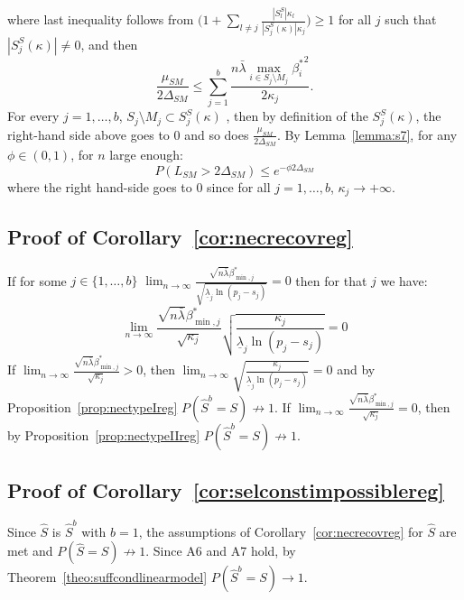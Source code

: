 \documentclass[aos]{imsart}
\theoremstyle{plain}
\begin{document}
where last inequality follows from $\Big(1+\sum_{l\neq j}\frac{|S_l^S|\kappa_l}{|S_j^{S}(\kappa)|\kappa_j}\Big)\geq 1$ for all $j$ such that $|S_j^{S}(\kappa)|\neq 0$, and then
$$\frac{\mu_{SM}}{2\Delta_{SM}}\leq \sum_{j=1}^b\frac{n\bar{\lambda}\max_{i\in S_j\setminus M_j}{\beta_i^*}^2}{2\kappa_j}.$$
For every $j=1,\ldots,b$, $S_j\setminus M_j \subset S_j^{S}(\kappa)$ , then by definition of the $S_j^{S}(\kappa)$, the right-hand 
side above goes to 0 and so does $\frac{\mu_{SM}}{2\Delta_{SM}}$. By Lemma~\ref{lemma:s7}, for any $\phi \in (0,1)$, for $n$ large enough:
\begin{equation}
    P(L_{SM}> 2\Delta_{SM}) \leq e^{-\phi2\Delta_{SM}}
\end{equation} 
where the right hand-side goes to 0 since for all $j=1,\ldots,b$, $\kappa_j \to +\infty$. 

\subsection{Proof of Corollary~\ref{cor:necrecovreg}}
If for some $j\in\{1,\ldots,b\}$ $\lim_{n\to\infty}\frac{\sqrt{n\bar{\lambda}}\beta_{\min,j}^*}{\sqrt{\underline{\lambda}_j\ln(p_j-s_j)}} = 0$ then for that $j$ we have:
$$\lim_{n\to\infty}\frac{\sqrt{n\bar{\lambda}}\beta_{\min,j}^*}{\sqrt{\kappa_j}}\sqrt{\frac{\kappa_j}{\underline{\lambda}_j\ln(p_j-s_j)}} = 0$$
If $\lim_{n\to\infty}\frac{\sqrt{n\bar{\lambda}}\beta_{\min,j}^*}{\sqrt{\kappa_j}}>0$, then $\lim_{n\to\infty}\sqrt{\frac{\kappa_j}{\underline{\lambda}_j\ln(p_j-s_j)}} = 0$ and by Proposition~\ref{prop:nectypeIreg} $P(\hat{S}^b=S)\not\to1$. If $\lim_{n\to\infty}\frac{\sqrt{n\bar{\lambda}}\beta_{\min,j}^*}{\sqrt{\kappa_j}}=0$, then by Proposition~\ref{prop:nectypeIIreg} $P(\hat{S}^b=S)\not\to1$.

\subsection{Proof of Corollary~\ref{cor:selconstimpossiblereg}}

Since $\hat{S}$ is $\hat{S}^b$ with $b=1$, the assumptions of Corollary~\ref{cor:necrecovreg} for $\hat{S}$ are met and $P(\hat{S} = S)\not \to 1$. Since A6 and A7 hold, by Theorem~\ref{theo:suffcondlinearmodel} $P(\hat{S}^b = S)\to 1$.
\end{document}
